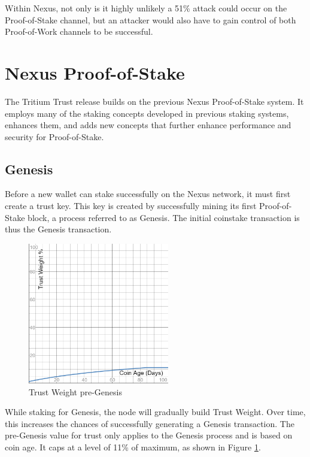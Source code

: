 \documentclass[11pt]{article}
\begin{document}
\noindent Within Nexus, not only is it highly unlikely a 51\% attack could occur on the Proof-of-Stake channel, but an attacker would also have to gain control of both Proof-of-Work channels to be successful. \\

\bigskip

\section{Nexus Proof-of-Stake}
The Tritium Trust release builds on the previous Nexus Proof-of-Stake system. It employs many of the staking concepts developed in previous staking systems, enhances them, and adds new concepts that further enhance performance and security for Proof-of-Stake.\\

\subsection{Genesis}
Before a new wallet can stake successfully on the Nexus network, it must first create a trust key. This key is created by successfully mining its first 
Proof-of-Stake block, a process referred to as Genesis. The initial coinstake transaction is thus the Genesis transaction. \\


\begin{figure}
    \centering
    \includegraphics[width=0.55\textwidth]{images/preGenesisTrustWeight.png}
    \caption{Trust Weight pre-Genesis \label{fig:preGenesisTrust}}
\end{figure}

\noindent While staking for Genesis, the node will gradually build Trust Weight. Over time, this increases the chances of successfully generating a Genesis transaction. The pre-Genesis value for trust only applies to the Genesis process and is based on coin age. It caps at a level of 11\% of maximum, as shown in Figure \ref{fig:preGenesisTrust}.\\
\end{document}
